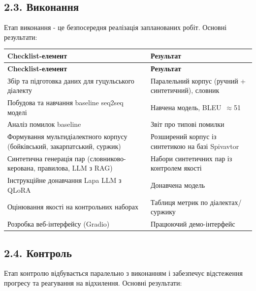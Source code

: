 \documentclass[14pt]{extarticle}
\begin{document}
\subsection*{2.3. Виконання}

Етап виконання - це безпосередня реалізація запланованих робіт. Основні результати:

\begin{longtable}{|p{}|p{}|}
\hline
\textbf{Checklist-елемент} & \textbf{Результат} \\
\hline
\endfirsthead
\hline
\textbf{Checklist-елемент} & \textbf{Результат} \\
\hline
\endhead
Збір та підготовка даних для гуцульського діалекту & Паралельний корпус (ручний + синтетичний), словник \\
\hline
Побудова та навчання baseline seq2seq моделі & Навчена модель, BLEU~$\approx$51 \\
\hline
Аналіз помилок baseline & Звіт про типові помилки \\
\hline
Формування мультидіалектного корпусу (бойківський, закарпатський, суржик) & Розширений корпус із синтетикою на базі Spivavtor \\
\hline
Синтетична генерація пар (словниково-керована, правилова, LLM з RAG) & Набори синтетичних пар із контролем якості \\
\hline
Інструкційне донавчання Lapa LLM з QLoRA & Донавчена модель \\
\hline
Оцінювання якості на контрольних наборах & Таблиця метрик по діалектах/суржику \\
\hline
Розробка веб-інтерфейсу (Gradio) & Працюючий демо-інтерфейс \\
\hline
\end{longtable}

\subsection*{2.4. Контроль}

Етап контролю відбувається паралельно з виконанням і забезпечує відстеження прогресу та реагування на відхилення. Основні результати:
\end{document}
